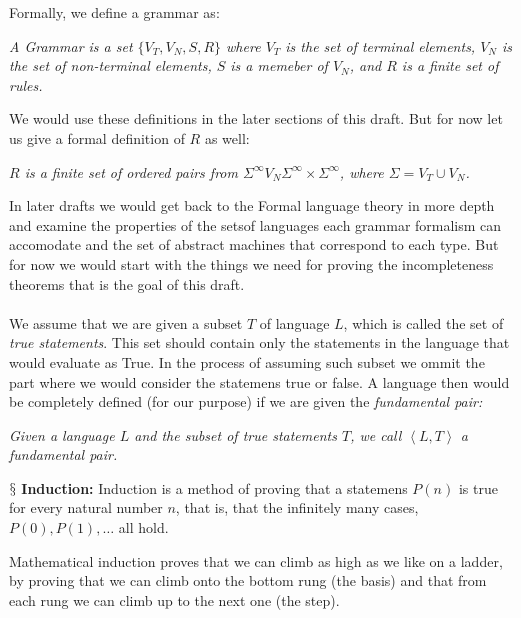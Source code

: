 \documentclass[10pt,a4paper]{article}
\newcounter{theo}
\newcommand{\newpoint}[1]{\indent$\mathsection$ \textbf{#1}}
\begin{document}
                    Formally, we define a grammar as:
                    \begin{define}
                        \textit{A Grammar is a set $\{V_T,V_N,S, R\}$ where $V_T$ is the set of terminal elements, $V_N$ is the set of non-terminal elements, $S$ is a memeber of $V_N$, and $R$ is a finite set of rules.}
                    \end{define}
                    We would use these definitions in the later sections of this draft. But for now let us give a formal definition of $R$ as well:
                    \begin{define}
                        \textit{$R$ is a finite set of ordered pairs from $\Sigma^\infty V_N \Sigma^\infty\times \Sigma^\infty$, where $\Sigma = V_T\cup V_N$.}
                    \end{define}
                    In later drafts we would get back to the Formal language theory in more depth and examine the properties of the setsof languages each grammar formalism can accomodate and the set of abstract machines that correspond to each type. But for now we would start with the things we need for proving the incompleteness theorems that is the goal of this draft.
                    \\
                    \\
                    We assume that we are given a subset $T$ of language $L$, which is called the set of \textit{true statements}. This set should contain only the statements in the language that would evaluate as True. In the process of assuming such subset we ommit the part where we would consider the statemens true or false. A language then would be completely defined (for our purpose) if we are given the \textit{fundamental pair:}
                    \begin{define}
                        \textit{Given a language $L$ and the subset of true statements $T$, we call $\left<L,T\right>$ a fundamental pair.}
                    \end{define}
                    \newpoint{Induction:} Induction is a method of proving that a statemens $P(n)$ is true for every natural number $n$, that is, that the infinitely many cases, $P(0), P(1),\dots$ all hold. \cite{enwiki:1157726892}
                    \begin{qt}
                        Mathematical induction proves that we can climb as high as we like on a ladder, by proving that we can climb onto the bottom rung (the basis) and that from each rung we can climb up to the next one (the step).
                    \end{qt}
\end{document}

